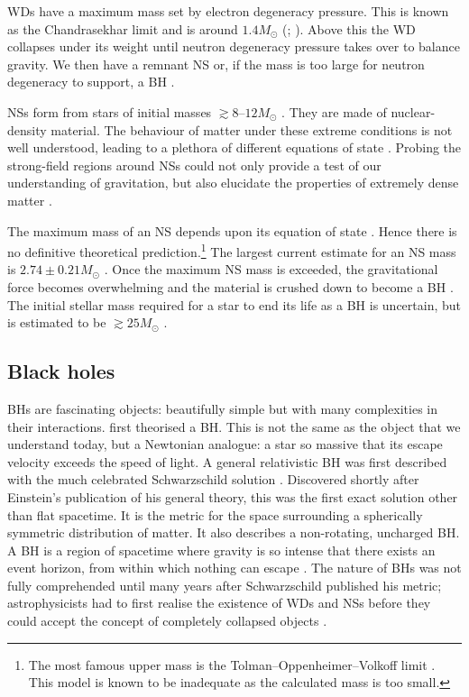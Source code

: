 WDs have a maximum mass set by electron degeneracy pressure. This is known as the Chandrasekhar limit and is around $1.4 M_\odot$ (\citealt[section 3.4]{Shapiro1983}; \citealt{Nomoto1987,Timmes1996}). %
Above this the WD collapses under its weight until neutron degeneracy pressure takes over to balance gravity. We then have a remnant NS or, if the mass is too large for neutron degeneracy to support, a BH \citep{Woosley2002,Langer2012}.

NSs form from stars of initial masses $\gtrsim 8$--$12 M_\odot$ \citep{Woosley2002,Poelarends2008,Langer2012}. They are made of nuclear-density material. The behaviour of matter under these extreme conditions is not well understood, leading to a plethora of different equations of state \citep{Lattimer2012}. Probing the strong-field regions around NSs could not only provide a test of our understanding of gravitation, but also elucidate the properties of extremely dense matter \citep[e.g.,][]{Read2009,Ozel2009,Lackey2012}.

The maximum mass of an NS depends upon its equation of state \citep[section 9.3]{Shapiro1983}. Hence there is no definitive theoretical prediction.\footnote{The most famous upper mass is the Tolman--Oppenheimer--Volkoff limit \citep{Tolman1939,Oppenheimer1939}. This model is known to be inadequate as the calculated mass is too small.} The largest current estimate for an NS mass is $2.74 \pm 0.21 M_\odot$ \citep{Freire2008,Ozel2012}. Once the maximum NS mass is exceeded, the gravitational force becomes overwhelming and the material is crushed down to become a BH \citep[section 12.1]{Shapiro1983}. The initial stellar mass required for a star to end its life as a BH is uncertain, but is estimated to be $\gtrsim 25 M_\odot$ \citep{Woosley2002,Tauris2011}.

\subsection{Black holes}

BHs are fascinating objects: beautifully simple but with many complexities in their interactions. \citet{Michell1784} first theorised a BH. This is not the same as the object that we understand today, but a Newtonian analogue: a star so massive that its escape velocity exceeds the speed of light. A general relativistic BH was first described with the much celebrated Schwarzschild solution \citep{Schwarzschild1916}. Discovered shortly after Einstein's publication of his general theory, this was the first exact solution other than flat spacetime. It is the metric for the space surrounding a spherically symmetric distribution of matter. It also describes a non-rotating, uncharged BH. A BH is a region of spacetime where gravity is so intense that there exists an event horizon, from within which nothing can escape \citep[section 33.1]{Misner1973}. The nature of BHs was not fully comprehended until many years after Schwarzschild published his metric; astrophysicists had to first realise the existence of WDs and NSs before they could accept the concept of completely collapsed objects \citep{Israel1987}.

